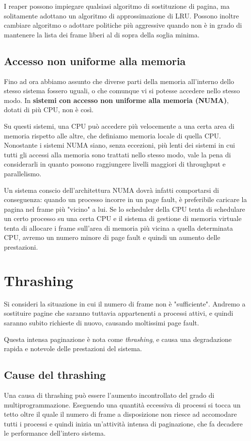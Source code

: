         I reaper possono impiegare qualsiasi algoritmo di sostituzione di pagina, ma solitamente adottano un algoritmo di approssimazione di LRU. Possono inoltre cambiare algoritmo o adottare politiche più aggressive quando non è in grado di mantenere la lista dei frame liberi al di sopra della soglia minima.
        
    \subsection{Accesso non uniforme alla memoria}
        Fino ad ora abbiamo assunto che diverse parti della memoria all'interno dello stesso sistema fossero uguali, o che comunque vi si potesse accedere nello stesso modo. In \textbf{sistemi con accesso non uniforme alla memoria (NUMA)}, dotati di più CPU, non è così.
        
        Su questi sistemi, una CPU può accedere più velocemente a una certa area di memoria rispetto alle altre, che definiamo memoria locale di quella CPU. Nonostante i sistemi NUMA siano, senza eccezioni, più lenti dei sistemi in cui tutti gli accessi alla memoria sono trattati nello stesso modo, vale la pena di considerarli in quanto possono raggiungere livelli maggiori di throughput e parallelismo.
        
        Un sistema conscio dell'architettura NUMA dovrà infatti comportarsi di conseguenza: quando un processo incorre in un page fault, è preferibile caricare la pagina nel frame più "vicino" a lui. Se lo scheduler della CPU tenta di schedulare un certo processo su una certa CPU e il sistema di gestione di memoria virtuale tenta di allocare i frame sull'area di memoria più vicina a quella determinata CPU, avremo un numero minore di page fault e quindi un aumento delle prestazioni.
        
\section{Thrashing}
    Si consideri la situazione in cui il numero di frame non è "sufficiente". Andremo a sostituire pagine che saranno tuttavia appartenenti a processi attivi, e quindi saranno subito richieste di nuovo, causando moltissimi page fault.
    
    Questa intensa paginazione è nota come \textit{thrashing}, e causa una degradazione rapida e notevole delle prestazioni del sistema.
    
    \subsection{Cause del thrashing}
        Una causa di thrashing può essere l'aumento incontrollato del grado di multiprogrammazione. Eseguendo una quantità eccessiva di processi si tocca un tetto oltre il quale il numero di frame a disposizione non riesce ad accomodare tutti i processi e quindi inizia un'attività intensa di paginazione, che fa decadere le performance dell'intero sistema.
        
